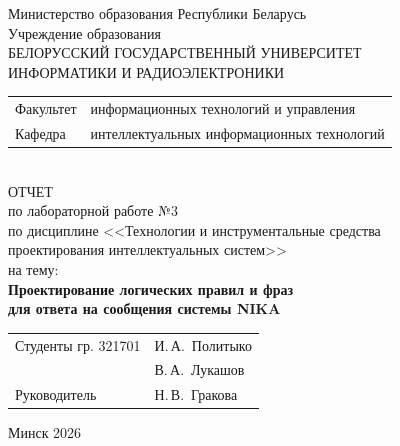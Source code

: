 \begin{titlepage}
	\begin{center}
		Министерство образования Республики Беларусь\\[1em]
		Учреждение образования\\
		БЕЛОРУССКИЙ ГОСУДАРСТВЕННЫЙ УНИВЕРСИТЕТ \\
		ИНФОРМАТИКИ И РАДИОЭЛЕКТРОНИКИ\\[1em]
		
		\begin{minipage}{\textwidth}
			\begin{flushleft}
				\begin{tabular}{ l l }
					Факультет & информационных технологий и управления\\
					Кафедра   & интеллектуальных информационных технологий
				\end{tabular}
			\end{flushleft}
		\end{minipage}\\[1em]
		
		{ОТЧЕТ}\\
		{по лабораторной работе №3}\\
		{по дисциплине <<Технологии и инструментальные средства}\\
		{проектирования интеллектуальных систем>>}\\
		{на тему:}\\[1em]
		\textbf{Проектирование логических правил и фраз}\\
		\textbf{для ответа на сообщения системы NIKA}\\[1em]
		
		\vspace{2em}
		\begin{tabular}{ p{}p{} }
			Студенты гр. 321701 & И.\,А.~Политыко \\
			& В.\,А.~Лукашов \\
			Руководитель & Н.\,В.~Гракова \\
		\end{tabular}
		
		\vfill
		{\normalsize Минск 2026}
	\end{center}
\end{titlepage}
